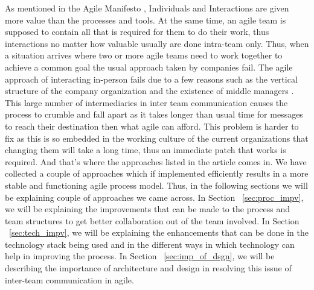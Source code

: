 As mentioned in the Agile Manifesto \cite{beck2001agile}, Individuals and Interactions are given more value than the processes and tools.
At the same time, an agile team is supposed to contain all that is required for them to do their work, thus interactions no matter how valuable usually are done intra-team only.
Thus, when a situation arrives where two or more agile teams need to work together to achieve a common goal the usual approach taken by companies fail.
The agile approach of interacting in-person fails due to a few reasons such as the vertical structure of the company organization and the existence of middle managers \cite{dzone_article}.
This large number of intermediaries in inter team communication causes the process to crumble and fall apart as it takes longer than usual time for messages to reach their destination then what agile can afford.
This problem is harder to fix as this is so embedded in the working culture of the current organizations that changing them will take a long time, thus an immediate patch that works is required.
And that’s where the approaches listed in the article comes in.
We have collected a couple of approaches which if implemented efficiently results in a more stable and functioning agile process model. 
Thus, in the following sections we will be explaining couple of approaches we came across.
\linebreak
\linebreak
In Section ~\ref{sec:proc_impv}, we will be explaining the improvements that can be made to the process and team structures to get better collaboration out of the team involved.
\linebreak
\linebreak
In Section ~\ref{sec:tech_impv}, we will be explaining the enhancements that can be done in the technology stack being used and in the different ways in which technology can help in improving the process.
\linebreak
\linebreak
In Section ~\ref{sec:imp_of_dsgn}, we will be describing the importance of architecture and design in resolving this issue of inter-team communication in agile.

